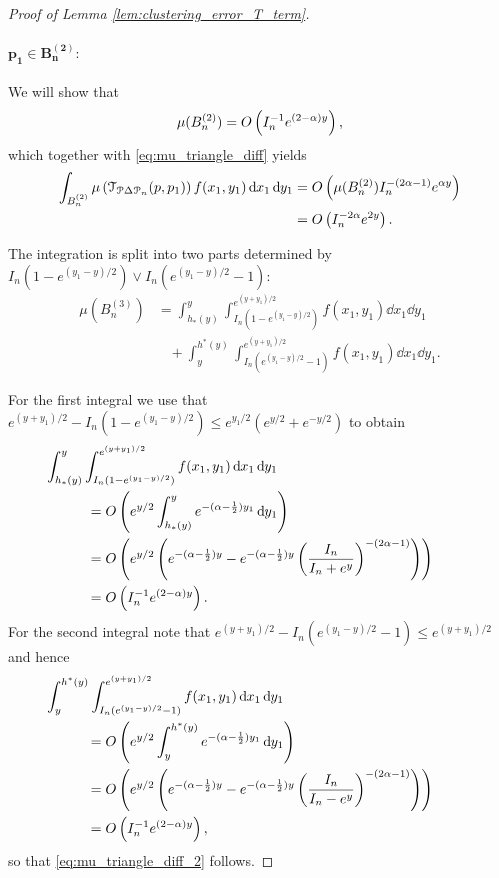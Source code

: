 \begin{proof}[Proof of Lemma \ref{lem:clustering_error_T_term}]
\paragraph{$\bm{p_1 \in B_n^{(2)}}:$}

We will show that
\begin{equation}\label{eq:mu_triangle_diff_2}
	\mu(B_n^{(2)}) = O\left(I_n^{-1} e^{(2-\alpha)y}\right),
\end{equation}
which together with \eqref{eq:mu_triangle_diff} yields
\begin{align*}
	\int_{B_n^{(2)}} \mu\left(\mathcal{T}_{{\mathcal P} \Delta {\mathcal P}_n}(p,p_1)\right) 
		f(x_1,y_1)	\operatorname{\mathrm{d}\hspace{-2pt}} x_1 \operatorname{\mathrm{d}\hspace{-2pt}} y_1
	&= O\left(\mu(B_n^{(2)}) I_n^{-(2\alpha - 1)} e^{\alpha y}\right)\\
	&= O\left(I_n^{-2\alpha} e^{2y}\right).
\end{align*}

The integration is split into two parts determined by $I_n\left(1 - e^{(y_1-y)/2}\right) \vee 
	I_n\left(e^{(y_1 - y)/2} - 1\right)$:
\begin{align*}
	\mu(B_n^{(3)}) &= \int_{h_\ast(y)}^{y} \int_{I_n(1-e^{(y_1-y)/2})}^{e^{(y + y_1)/2}} 
		f(x_1,y_1) \dd x_1 \dd y_1\\
	&\hspace{10pt} + \int_y^{h^\ast(y)} \int_{I_n(e^{(y_1-y)/2}-1)}^{e^{(y + y_1)/2}} 
		f(x_1,y_1) \dd x_1 \dd y_1.
\end{align*}

For the first integral we use that $e^{(y + y_1)/2} - I_n(1-e^{(y_1-y)/2}) \le e^{y_1/2}\left(e^{y/2} + e^{-y/2}\right)$ to obtain
\begin{align*}
	&\hspace{-30pt}\int_{h_\ast(y)}^{y} \int_{I_n(1-e^{(y_1-y)/2})}^{e^{(y + y_1)/2}} f(x_1,y_1) 
		\dd x_1 \dd y_1\\
	&= \bigO{e^{y/2} \int_{h_\ast(y)}^{y} e^{-(\alpha - \frac{1}{2})y_1} \dd y_1}\\
	&= \bigO{e^{y/2}\left(e^{-(\alpha - \frac{1}{2})y} - e^{-(\alpha - \frac{1}{2})y} 
		\left(\frac{I_n}{I_n + e^y}\right)^{-(2\alpha - 1)}\right)}\\
	&= \bigO{I_n^{-1} e^{(2-\alpha)y}}.
\end{align*}
For the second integral note that $e^{(y + y_1)/2} - I_n(e^{(y_1-y)/2}-1) \le e^{(y + y_1)/2}$ and hence
\begin{align*}
	&\hspace{-30pt}\int_y^{h^\ast(y)} \int_{I_n(e^{(y_1-y)/2}-1)}^{e^{(y + y_1)/2}} f(x_1,y_1) 
		\dd x_1 \dd y_1\\
	&= \bigO{e^{y/2} \int_y^{h^\ast(y)} e^{-(\alpha - \frac{1}{2})y_1} \dd y_1}\\
	&= \bigO{e^{y/2} \left(e^{-(\alpha - \frac{1}{2})y} - e^{-(\alpha - \frac{1}{2})y}
		\left(\frac{I_n}{I_n - e^y}\right)^{-(2\alpha - 1)}\right)}\\
	&= \bigO{I_n^{-1} e^{(2-\alpha)y}},
\end{align*}
so that \eqref{eq:mu_triangle_diff_2} follows.


\end{proof}
